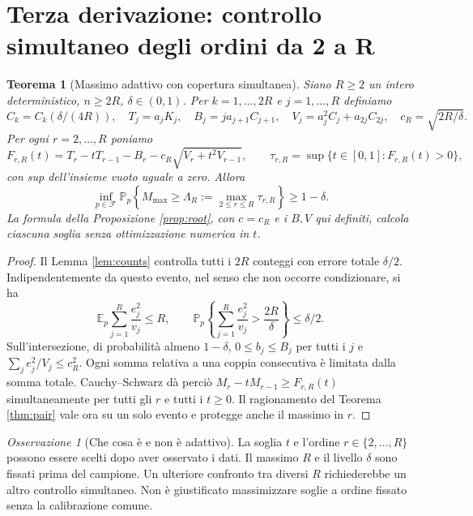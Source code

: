 \documentclass[11pt,a4paper]{article}
\newtheorem{theorem}[proposition]{Teorema}
\theoremstyle{remark}\newtheorem{remark}[proposition]{Osservazione}
\newcommand{\E}{\mathbb E_p}
\newcommand{\Pp}{\mathbb P_p}
\newcommand{\Mmax}{M_{\max}}
\newcommand{\F}{\mathcal F}
\begin{document}
\section{Terza derivazione: controllo simultaneo degli ordini da 2 a R}
\begin{theorem}[Massimo adattivo con copertura simultanea]\label{thm:simultaneous}
Siano $R\ge2$ un intero deterministico, $n\ge2R$, $\delta\in(0,1)$.
Per $k=1,\ldots,2R$ e $j=1,\ldots,R$ definiamo
\[
 C_k=C_k(\delta/(4R)),\quad
 T_j=a_jK_j,\quad B_j=j a_{j+1}C_{j+1},\quad
 V_j=a_j^2C_j+a_{2j}C_{2j},\quad c_R=\sqrt{2R/\delta}.
\]
Per ogni $r=2,\ldots,R$ poniamo
\[
 F_{r,R}(t)=T_r-tT_{r-1}-B_r-c_R\sqrt{V_r+t^2V_{r-1}},
 \qquad \tau_{r,R}=\sup\{t\in[0,1]:F_{r,R}(t)>0\},
\]
con sup dell'insieme vuoto uguale a zero. Allora
\[
 \boxed{\inf_{p\in\F}\Pp\left\{\Mmax\ge
 \Lambda_R:=\max_{2\le r\le R}\tau_{r,R}\right\}\ge1-\delta.}
\]
La formula della Proposizione \ref{prop:root}, con $c=c_R$ e i $B,V$
qui definiti, calcola ciascuna soglia senza ottimizzazione numerica in $t$.
\end{theorem}
\begin{proof}
Il Lemma \ref{lem:counts} controlla tutti i $2R$ conteggi con errore
totale $\delta/2$. Indipendentemente da questo evento, nel senso che
non occorre condizionare, si ha
\[
 \E\sum_{j=1}^R\frac{e_j^2}{v_j}\le R,\qquad
 \Pp\left\{\sum_{j=1}^R\frac{e_j^2}{v_j}>\frac{2R}{\delta}\right\}
 \le\delta/2.
\]
Sull'intersezione, di probabilità almeno $1-\delta$,
$0\le b_j\le B_j$ per tutti i $j$ e
$\sum_j e_j^2/V_j\le c_R^2$.
Ogni somma relativa a una coppia consecutiva è limitata dalla somma totale.
Cauchy--Schwarz dà perciò $M_r-tM_{r-1}\ge F_{r,R}(t)$ simultaneamente
per tutti gli $r$ e tutti i $t\ge0$. Il ragionamento del Teorema
\ref{thm:pair} vale ora su un solo evento e protegge anche il massimo in $r$.
\end{proof}
\begin{remark}[Che cosa è e non è adattivo]
La soglia $t$ e l'ordine $r\in\{2,\ldots,R\}$ possono essere scelti
dopo aver osservato i dati. Il massimo $R$ e il livello $\delta$ sono
fissati prima del campione. Un ulteriore confronto tra diversi $R$
richiederebbe un altro controllo simultaneo. Non è giustificato
massimizzare soglie a ordine fissato senza la calibrazione comune.
\end{remark}
\end{document}
